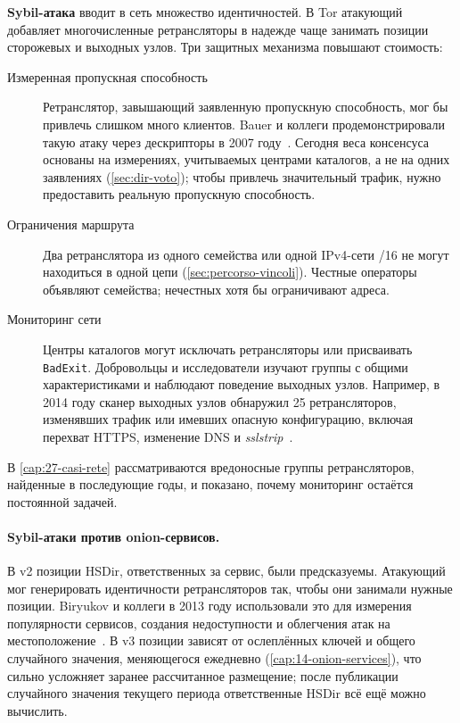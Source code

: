 \textbf{Sybil-атака} вводит в сеть множество идентичностей. В Tor атакующий добавляет многочисленные ретрансляторы в надежде чаще занимать позиции сторожевых и выходных узлов. Три защитных механизма повышают стоимость:
\begin{description}
  \item[Измеренная пропускная способность] Ретранслятор, завышающий заявленную пропускную способность, мог бы привлечь слишком много клиентов. Bauer и коллеги продемонстрировали такую атаку через дескрипторы в 2007 году~\cite{bauer2007lowresource}. Сегодня веса консенсуса основаны на измерениях, учитываемых центрами каталогов, а не на одних заявлениях (\cref{sec:dir-voto}); чтобы привлечь значительный трафик, нужно предоставить реальную пропускную способность.
  \item[Ограничения маршрута] Два ретранслятора из одного семейства или одной IPv4-сети /16 не могут находиться в одной цепи (\cref{sec:percorso-vincoli}). Честные операторы объявляют семейства; нечестных хотя бы ограничивают адреса.
  \item[Мониторинг сети] Центры каталогов могут исключать ретрансляторы или присваивать \texttt{BadExit}. Добровольцы и исследователи изучают группы с общими характеристиками и наблюдают поведение выходных узлов. Например, в 2014 году сканер выходных узлов обнаружил 25 ретрансляторов, изменявших трафик или имевших опасную конфигурацию, включая перехват HTTPS, изменение DNS и \emph{sslstrip}~\cite{winter2014spoiled}.
\end{description}
В \cref{cap:27-casi-rete} рассматриваются вредоносные группы ретрансляторов, найденные в последующие годы, и показано, почему мониторинг остаётся постоянной задачей.

\paragraph{Sybil-атаки против onion-сервисов.} В v2 позиции HSDir, ответственных за сервис, были предсказуемы. Атакующий мог генерировать идентичности ретрансляторов так, чтобы они занимали нужные позиции. Biryukov и коллеги в 2013 году использовали это для измерения популярности сервисов, создания недоступности и облегчения атак на местоположение~\cite{biryukov2013trawling}. В v3 позиции зависят от ослеплённых ключей и общего случайного значения, меняющегося ежедневно (\cref{cap:14-onion-services}), что сильно усложняет заранее рассчитанное размещение; после публикации случайного значения текущего периода ответственные HSDir всё ещё можно вычислить.

